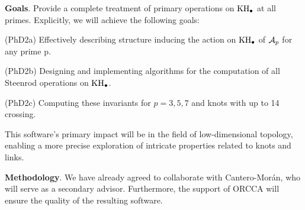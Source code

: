 \medskip\noindent\textbf{Goals}.
Provide a complete treatment of primary operations on $\mathrm{KH}_\bullet$ at all primes.
Explicitly, we will achieve the following goals:

\smallskip\noindent(PhD2a)
Effectively describing structure inducing the action on $\mathrm{KH}_\bullet$ of $\mathcal{A}_p$ for any prime p.\par
\smallskip\noindent(PhD2b)
Designing and implementing algorithms for the computation of all Steenrod operations on $\mathrm{KH}_\bullet$.\par
\smallskip\noindent(PhD2c)
Computing these invariants for $p=3,5,7$ and knots with up to 14 crossing.

\smallskip\noindent This software's primary impact will be in the field of low-dimensional topology, enabling a more precise exploration of intricate properties related to knots and links.

\smallskip\noindent\textbf{Methodology}.
We have already agreed to collaborate with Cantero-Morán, who will serve as a secondary advisor.
Furthermore, the support of ORCCA will ensure the quality of the resulting software.